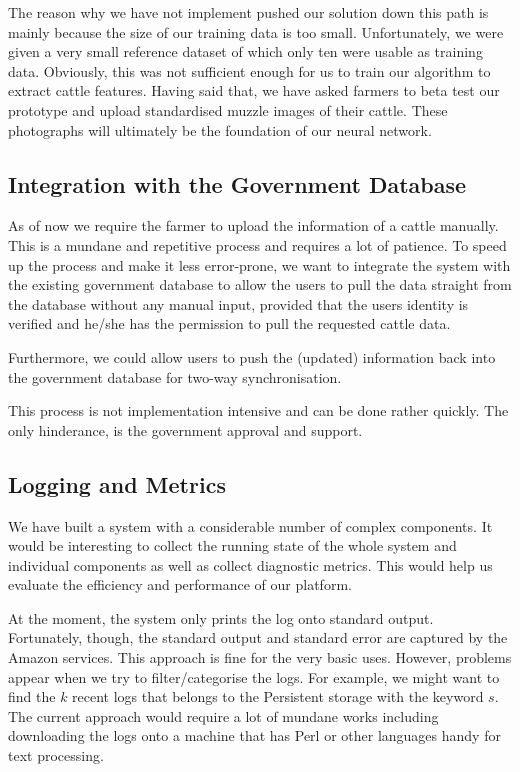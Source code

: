 The reason why we have not implement pushed our solution down this path is mainly because the size of our training data is too small. Unfortunately, we were given a very small reference dataset of which only ten were usable as training data. Obviously, this was not sufficient enough for us to train our algorithm to extract cattle features. Having said that, we have asked farmers to beta test our prototype and upload standardised muzzle images of their cattle. These photographs will ultimately be the foundation of our neural network.

\subsection{Integration with the Government Database}

As of now we require the farmer to upload the information of a cattle manually. This is a mundane and repetitive process and requires a lot of patience. To speed up the process and make it less error-prone, we want to integrate the system with the existing government database to allow the users to pull the data straight from the database without any manual input, provided that the users identity is verified and he/she has the permission to pull the requested cattle data.

Furthermore, we could allow users to push the (updated) information back into the government database for two-way synchronisation.

This process is not implementation intensive and can be done rather quickly. The only hinderance, is the government approval and support.

\subsection{Logging and Metrics}

We have built a system with a considerable number of complex components. It would be interesting to collect the running state of the whole system and individual components as well as collect diagnostic metrics. This would help us evaluate the efficiency and performance of our platform.

At the moment, the system only prints the log onto standard output. Fortunately, though, the standard output and standard error are captured by the Amazon services. This approach is fine for the very basic uses. However, problems appear when we try to filter/categorise the logs. For example, we might want to find the $k$ recent logs that belongs to the Persistent storage with the keyword $s$. The current approach would require a lot of mundane works including downloading the logs onto a machine that has Perl or other languages handy for text processing.

